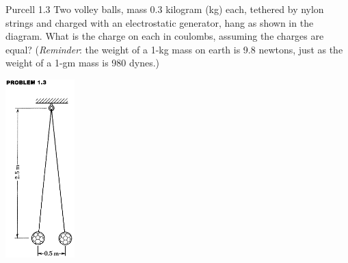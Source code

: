 \documentclass{esg8022pset}
\begin{document}

\begin{problem}{Purcell 1.3}
  Two volley balls, mass 0.3 kilogram (kg) each, tethered by nylon strings and charged with an electrostatic generator, hang as shown in the diagram. What is the charge on each in coulombs, assuming the charges are equal? (\emph{Reminder}: the weight of a 1-kg mass on earth is 9.8 newtons, just as the weight of a 1-gm mass is 980 dynes.)
  \begin{center}\includegraphics[width=0.2\textwidth]{ps01_1}\end{center} 
\end{problem}
\end{document}

